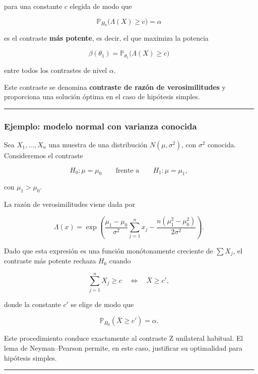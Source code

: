 \documentclass[
]{article}
\begin{document}
para una constante \(c\) elegida de modo que

\[
\mathbb{P}_{H_0}\bigl(\Lambda(X)\ge c\bigr)=\alpha
\]

es el contraste \textbf{más potente}, es decir, el que maximiza la potencia

\[
\beta(\theta_1)=\mathbb{P}_{\theta_1}\bigl(\Lambda(X)\ge c\bigr)
\]

entre todos los contrastes de nivel \(\alpha\).

Este contraste se denomina \textbf{contraste de razón de verosimilitudes} y proporciona una solución óptima en el caso de hipótesis simples.

\begin{center}\rule{0.5\linewidth}{0.5pt}\end{center}

\subsubsection{Ejemplo: modelo normal con varianza conocida}\label{ejemplo-modelo-normal-con-varianza-conocida}

Sea \(X_1,\dots,X_n\) una muestra de una distribución \(N(\mu,\sigma^2)\), con \(\sigma^2\) conocida. Consideremos el contraste

\[
H_0:\mu=\mu_0
\qquad \text{frente a} \qquad
H_1:\mu=\mu_1,
\]

con \(\mu_1>\mu_0\).

La razón de verosimilitudes viene dada por

\[
\Lambda(x)
=\exp\!\left(
\frac{\mu_1-\mu_0}{\sigma^2}\sum_{j=1}^n x_j
-\frac{n(\mu_1^2-\mu_0^2)}{2\sigma^2}
\right).
\]

Dado que esta expresión es una función monótonamente creciente de \(\sum X_j\), el contraste más potente rechaza \(H_0\) cuando

\[
\sum_{j=1}^n X_j \ge c
\quad \Longleftrightarrow \quad
\bar X \ge c',
\]

donde la constante \(c'\) se elige de modo que

\[
\mathbb{P}_{H_0}(\bar X\ge c')=\alpha.
\]

Este procedimiento conduce exactamente al contraste Z unilateral habitual. El lema de Neyman--Pearson permite, en este caso, justificar su optimalidad para hipótesis simples.

\begin{center}\rule{0.5\linewidth}{0.5pt}\end{center}
\end{document}
